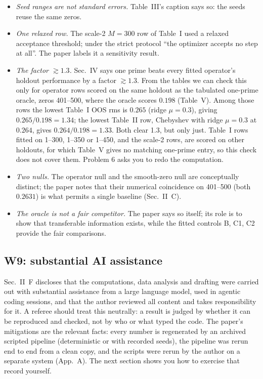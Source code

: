 \begin{itemize}
\item \emph{Seed ranges are not standard errors.} Table~III's caption says so: the seeds reuse the same zeros.
\item \emph{One relaxed row.} The scale-2 $M=300$ row of Table~I used a relaxed acceptance threshold; under the strict protocol ``the optimizer accepts no step at all''. The paper labels it a sensitivity result.
\item \emph{The factor $\gtrsim1.3$.} Sec.~IV says one prime beats every fitted operator's holdout performance by a factor $\gtrsim1.3$. From the tables we can check this only for operator rows scored on the same holdout as the tabulated one-prime oracle, zeros 401--500, where the oracle scores $0.198$ (Table~V). Among those rows the lowest Table~I OOS rms is $0.265$ (ridge $\mu=0.3$), giving $0.265/0.198=1.34$; the lowest Table~II row, Chebyshev with ridge $\mu=0.3$ at $0.264$, gives $0.264/0.198=1.33$. Both clear 1.3, but only just. Table~I rows fitted on 1--300, 1--350 or 1--450, and the scale-2 rows, are scored on other holdouts, for which Table~V gives no matching one-prime entry, so this check does not cover them. Problem 6 asks you to redo the computation.
\item \emph{Two nulls.} The operator null and the smooth-zero null are conceptually distinct; the paper notes that their numerical coincidence on 401--500 (both $0.2631$) is what permits a single baseline (Sec.~II~C).
\item \emph{The oracle is not a fair competitor.} The paper says so itself; its role is to show that transferable information exists, while the fitted controls B, C1, C2 provide the fair comparisons.
\end{itemize}

\subsection{W9: substantial AI assistance}

Sec.~II~F discloses that the computations, data analysis and drafting were carried out with substantial assistance from a large language model, used in agentic coding sessions, and that the author reviewed all content and takes responsibility for it. A referee should treat this neutrally: a result is judged by whether it can be reproduced and checked, not by who or what typed the code. The paper's mitigations are the relevant facts: every number is regenerated by an archived scripted pipeline (deterministic or with recorded seeds), the pipeline was rerun end to end from a clean copy, and the scripts were rerun by the author on a separate system (App.~A). The next section shows you how to exercise that record yourself.

